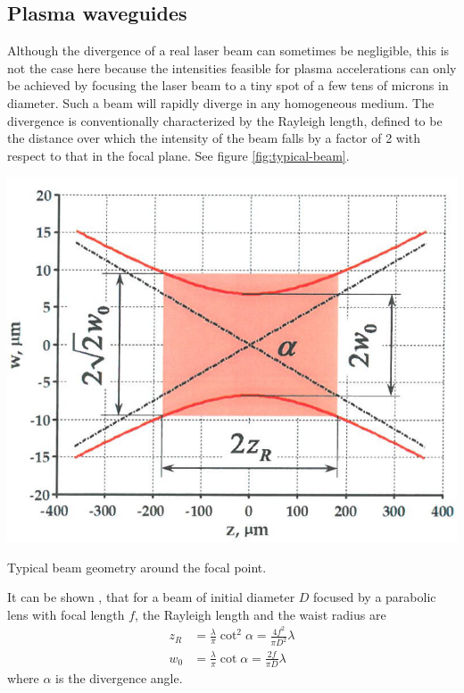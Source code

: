 \documentclass[../main.tex]{subfiles}
\begin{document}
\subsection{Plasma waveguides}
Although the divergence of a real laser beam can sometimes be negligible, this is not the case here because the intensities feasible for plasma accelerations can only be achieved by focusing the laser beam to a tiny spot of a few tens of microns in diameter. Such a beam will rapidly diverge in any homogeneous medium. The divergence is conventionally characterized by the Rayleigh length, defined to be the distance over which the intensity of the beam falls by a factor of 2 with respect to that in the focal plane. See figure \ref{fig:typical-beam}.
\begin{marginfigure}
\includegraphics[width=\marginparwidth]{figures/beam-geometry.PNG}
\caption{Typical beam geometry around the focal point.}
\label{fig:typical-beam}
\end{marginfigure}
It can be shown \cite{Saleh2019BeamOptics}, that for a beam of initial diameter $D$ focused by a parabolic lens with focal length $f$, the Rayleigh length and the waist radius are
\begin{equation}
\begin{split}
z_R & = \frac{\lambda}{\pi} \cot^2\alpha = \frac{4f^2}{\pi D^2}\lambda
\\
w_0 & = \frac{\lambda}{\pi}\cot \alpha=\frac{2f}{\pi D}\lambda
\end{split}
\label{eq:beamParameters}
\end{equation}
where $\alpha$ is the divergence angle.
\end{document}
